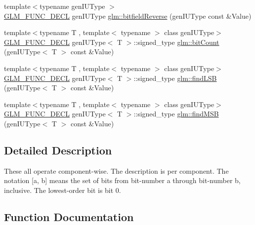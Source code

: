 \begin{DoxyCompactItemize}
\item 
{\footnotesize template$<$typename gen\+I\+U\+Type $>$ }\\\hyperlink{setup_8hpp_ab2d052de21a70539923e9bcbf6e83a51}{G\+L\+M\+\_\+\+F\+U\+N\+C\+\_\+\+D\+E\+CL} gen\+I\+U\+Type \hyperlink{group__core__func__integer_gac28880e609c6eeb0a28f1a54b1edc715}{glm\+::bitfield\+Reverse} (gen\+I\+U\+Type const \&Value)
\item 
{\footnotesize template$<$typename T , template$<$ typename $>$ class gen\+I\+U\+Type$>$ }\\\hyperlink{setup_8hpp_ab2d052de21a70539923e9bcbf6e83a51}{G\+L\+M\+\_\+\+F\+U\+N\+C\+\_\+\+D\+E\+CL} gen\+I\+U\+Type$<$ T $>$\+::signed\+\_\+type \hyperlink{group__core__func__integer_gaf5ecf64cbcb7f806a3c7915dd622209b}{glm\+::bit\+Count} (gen\+I\+U\+Type$<$ T $>$ const \&Value)
\item 
{\footnotesize template$<$typename T , template$<$ typename $>$ class gen\+I\+U\+Type$>$ }\\\hyperlink{setup_8hpp_ab2d052de21a70539923e9bcbf6e83a51}{G\+L\+M\+\_\+\+F\+U\+N\+C\+\_\+\+D\+E\+CL} gen\+I\+U\+Type$<$ T $>$\+::signed\+\_\+type \hyperlink{group__core__func__integer_ga43d5d9ec05ba4c46035c764ad5fd3135}{glm\+::find\+L\+SB} (gen\+I\+U\+Type$<$ T $>$ const \&Value)
\item 
{\footnotesize template$<$typename T , template$<$ typename $>$ class gen\+I\+U\+Type$>$ }\\\hyperlink{setup_8hpp_ab2d052de21a70539923e9bcbf6e83a51}{G\+L\+M\+\_\+\+F\+U\+N\+C\+\_\+\+D\+E\+CL} gen\+I\+U\+Type$<$ T $>$\+::signed\+\_\+type \hyperlink{group__core__func__integer_gaee931af2eaecf61b629b33899c9d6f29}{glm\+::find\+M\+SB} (gen\+I\+U\+Type$<$ T $>$ const \&Value)
\end{DoxyCompactItemize}


\subsection{Detailed Description}
These all operate component-\/wise. The description is per component. The notation \mbox{[}a, b\mbox{]} means the set of bits from bit-\/number a through bit-\/number b, inclusive. The lowest-\/order bit is bit 0. 

\subsection{Function Documentation}
\mbox{\label{group__core__func__integer_gaf5ecf64cbcb7f806a3c7915dd622209b}} 
